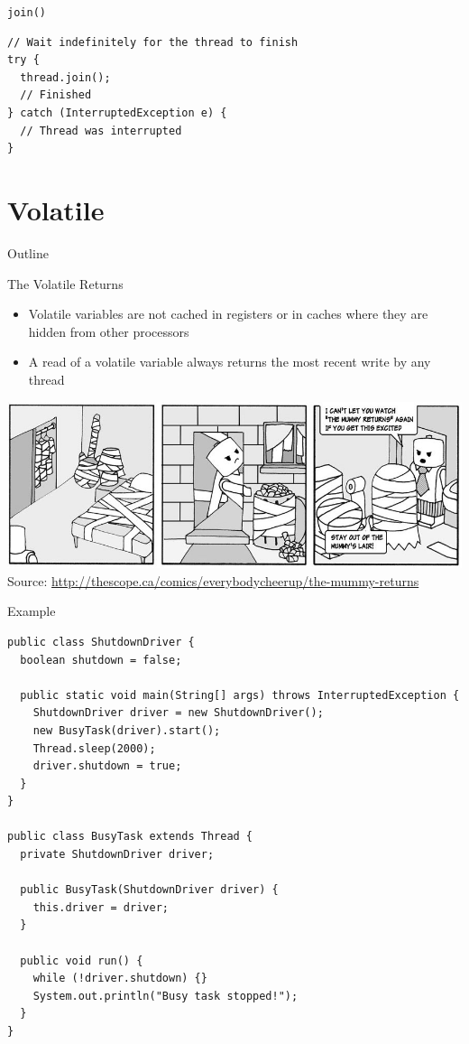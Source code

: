 \begin{frame}[fragile]{\lstinline{join()}}
\begin{lstlisting}
// Wait indefinitely for the thread to finish 
try { 
  thread.join(); 
  // Finished 
} catch (InterruptedException e) { 
  // Thread was interrupted 
} 
\end{lstlisting}
\end{frame}


\section{Volatile}

\begin{frame}{Outline}
  \tableofcontents[current]
\end{frame}

\begin{frame}{The Volatile Returns}
  \begin{itemize}
  \item Volatile variables are not cached in registers or in
    caches where they are hidden from other processors
  \item A read of a volatile variable always returns the most recent
    write by any thread
  \end{itemize}

  
  \begin{center}
    \includegraphics[width=\textwidth]{figures/the-mummy-returns} \\
    \tiny{Source: \url{http://thescope.ca/comics/everybodycheerup/the-mummy-returns}}
  \end{center}
\end{frame}

\begin{frame}[fragile]{Example}
\begin{lstlisting}[basicstyle=\fontsize{7}{9}\selectfont\ttfamily]
public class ShutdownDriver {
  boolean shutdown = false;

  public static void main(String[] args) throws InterruptedException {
    ShutdownDriver driver = new ShutdownDriver();
    new BusyTask(driver).start();
    Thread.sleep(2000);
    driver.shutdown = true;
  }
}

public class BusyTask extends Thread {
  private ShutdownDriver driver;

  public BusyTask(ShutdownDriver driver) {
    this.driver = driver;
  }

  public void run() {
    while (!driver.shutdown) {}
    System.out.println("Busy task stopped!");
  }
}
\end{lstlisting}
\end{frame}

